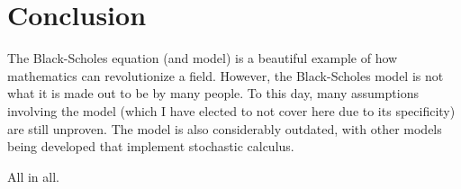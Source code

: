 \documentclass{article}
\begin{document}
\section*{Conclusion}

The Black-Scholes equation (and model) is a beautiful example of how mathematics can revolutionize a field. 
However, the Black-Scholes model is not what it is made out to be by many people. To this day, many assumptions involving the model 
(which I have elected to not cover here due to its specificity) are still unproven. The model is also considerably outdated, with other models being developed
that implement stochastic calculus. 

All in all. 


\end{document}

